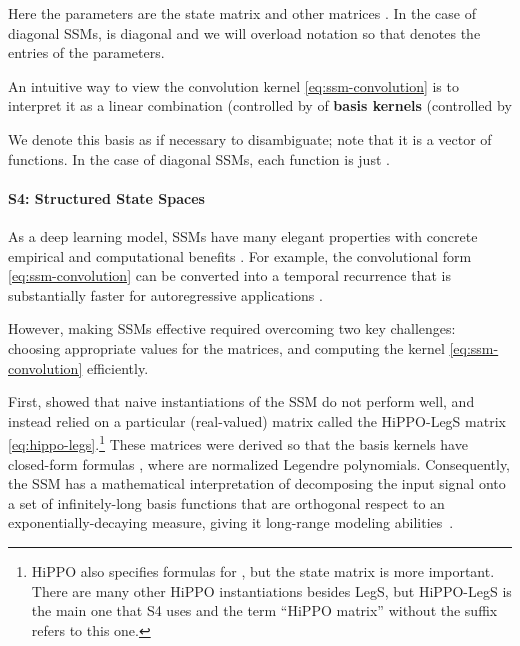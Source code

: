 \documentclass{article}
\begin{document}
\begin{minipage}{.5\linewidth}

\end{minipage}
\begin{minipage}{.5\linewidth}

\end{minipage}

Here the parameters are the state matrix  and other matrices .
In the case of diagonal SSMs,  is diagonal and we will overload notation so that  denotes the entries of the parameters.



An intuitive way to view the convolution kernel \eqref{eq:ssm-convolution} is to interpret it as a linear combination (controlled by  of \textbf{basis kernels}  (controlled by 

We denote this basis as  if necessary to disambiguate; note that it is a vector of  functions.
In the case of diagonal SSMs, each function  is just .

\paragraph{S4: Structured State Spaces}

As a deep learning model, SSMs have many elegant properties with concrete empirical and computational benefits \citep{gu2021lssl}.
For example, the convolutional form \eqref{eq:ssm-convolution} can be converted into a temporal recurrence that is substantially faster for autoregressive applications \citep{goel2022sashimi}.

However, making SSMs effective required overcoming two key challenges: choosing appropriate values for the matrices, and computing the kernel \eqref{eq:ssm-convolution} efficiently.

First, \citet{gu2021lssl} showed that naive instantiations of the SSM do not perform well,
and instead relied on a particular (real-valued) matrix  called the HiPPO-LegS matrix \eqref{eq:hippo-legs}.\footnote{HiPPO also specifies formulas for , but the state matrix  is more important. There are many other HiPPO instantiations besides LegS, but HiPPO-LegS is the main one that S4 uses and the term ``HiPPO matrix'' without the suffix refers to this one.}
These matrices were derived so that the basis kernels  have closed-form formulas , where  are normalized Legendre polynomials.
Consequently, the SSM has a mathematical interpretation of decomposing the input signal  onto a set of infinitely-long basis functions that are orthogonal respect to an exponentially-decaying measure,
giving it long-range modeling abilities~\citep{gu2022hippo}.
\end{document}
